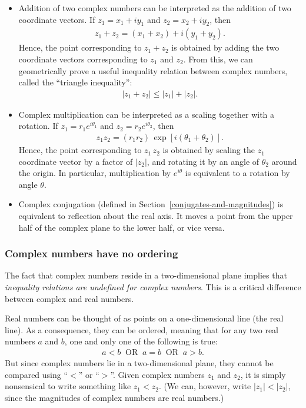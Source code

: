 \documentclass[10pt,a4paper]{article}
\begin{document}
\begin{itemize}
\item Addition of two complex numbers can be interpreted as the
  addition of two coordinate vectors. If $z_1 = x_1 + i y_1$ and $z_2
  = x_2 + i y_2$, then
  \begin{align}
    z_1 + z_2 = \left(x_1 + x_2\right) + i\left(y_1 + y_2\right).
  \end{align}
  Hence, the point corresponding to $z_1 + z_2$ is obtained by adding
  the two coordinate vectors corresponding to $z_1$ and $z_2$. From
  this, we can geometrically prove a useful inequality relation
  between complex numbers, called the ``triangle inequality'':
  \begin{align}
    |z_1 + z_2| \le |z_1| + |z_2|.
  \end{align}

\item Complex multiplication can be interpreted as a scaling together
  with a rotation.  If $z_1 = r_1e^{i\theta_1}$ and $z_2 =
  r_2e^{i\theta_2}$, then
  \begin{align}
    z_1 z_2 = \left(r_1 r_2\right) \,\exp[i(\theta_1 + \theta_2)].
  \end{align}
  Hence, the point corresponding to $z_1 \, z_2$ is obtained by
  scaling the $z_1$ coordinate vector by a factor of $|z_2|$, and
  rotating it by an angle of $\theta_2$ around the origin.  In
  particular, multiplication by $e^{i\theta}$ is equivalent to a
  rotation by angle $\theta$.

\item Complex conjugation (defined in
  Section~\ref{conjugates-and-magnitudes}) is equivalent to reflection
  about the real axis.  It moves a point from the upper half of the
  complex plane to the lower half, or vice versa.
\end{itemize}

\subsubsection{Complex numbers have no ordering}
\label{complex-numbers-have-no-ordering}

The fact that complex numbers reside in a two-dimensional plane
implies that \textit{inequality relations are undefined for complex
  numbers}. This is a critical difference between complex and real
numbers.

Real numbers can be thought of as points on a one-dimensional line
(the real line). As a consequence, they can be ordered, meaning that
for any two real numbers $a$ and $b$, one and only one of the
following is true:
\begin{align}
  a < b \;\; \mathrm{OR} \;\; a = b \;\; \mathrm{OR}\;\; a > b.
\end{align}
But since complex numbers lie in a two-dimensional plane, they cannot
be compared using ``$<$'' or ``$>$''. Given complex numbers $z_1$ and
$z_2$, it is simply nonsensical to write something like $z_1 <
z_2$. (We can, however, write $|z_1| < |z_2|$, since the magnitudes of
complex numbers are real numbers.)
\end{document}
